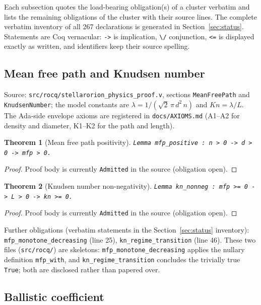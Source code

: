 \documentclass[11pt]{article}
\newtheorem{theorem}{Theorem}
\theoremstyle{definition}
\begin{document}
Each subsection quotes the load-bearing obligation(s) of a cluster
verbatim and lists the remaining obligations of the cluster with their
source lines. The complete verbatim inventory of all 267 declarations is
generated in Section~\ref{sec:status}. Statements are Coq vernacular:
\texttt{->} is implication, \texttt{\textbackslash/} conjunction,
\texttt{<=} is displayed exactly as written, and identifiers keep their
source spelling.

\subsection{Mean free path and Knudsen number}\label{sec:mfp}

Source: \texttt{src/rocq/stellarorion\_physics\_proof.v}, sections
\texttt{MeanFreePath} and \texttt{KnudsenNumber}; the model constants are
$\lambda = 1/(\sqrt{2}\,\pi\,d^2\,n)$ and $Kn = \lambda/L$. The Ada-side
envelope axioms are registered in \texttt{docs/AXIOMS.md}
(A1--A2 for density and diameter, K1--K2 for the path and length).

\begin{theorem}[Mean free path positivity]\label{thm:mfp-pos}
\texttt{Lemma mfp\_positive : n > 0 -> d > 0 -> mfp > 0.}
\end{theorem}
\begin{proof}
Proof body is currently \texttt{Admitted} in the source (obligation open).
\end{proof}

\begin{theorem}[Knudsen number non-negativity]\label{thm:kn-nonneg}
\texttt{Lemma kn\_nonneg : mfp >= 0 -> L > 0 -> kn >= 0.}
\end{theorem}
\begin{proof}
Proof body is currently \texttt{Admitted} in the source (obligation open).
\end{proof}

Further obligations (verbatim statements in the Section~\ref{sec:status}
inventory): \texttt{mfp\_monotone\_decreasing} (line 25),
\texttt{kn\_regime\_transition} (line 46). These two files
(\texttt{src/rocq/}) are skeletons: \texttt{mfp\_monotone\_decreasing}
applies the nullary definition \texttt{mfp\_with}, and
\texttt{kn\_regime\_transition} concludes the trivially true
\texttt{True}; both are disclosed rather than papered over.

\subsection{Ballistic coefficient}\label{sec:beta}
\end{document}
